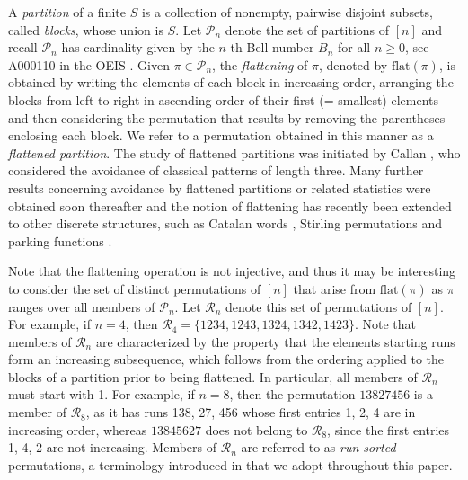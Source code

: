 \documentclass[11pt,a4paper]{article}
\begin{document}
A \emph{partition} of a finite $S$  is a collection of nonempty, pairwise disjoint subsets, called \emph{blocks}, whose union is $S$.  Let $\mathcal{P}_n$ denote the set of partitions of $[n]$ and recall $\mathcal{P}_n$ has cardinality given by the $n$-th Bell number $B_n$ for all $n\geq 0$, see A000110 in the OEIS \cite{Sl}.  Given $\pi \in \mathcal{P}_n$, the \emph{flattening} of $\pi$, denoted by $\text{flat}(\pi)$, is obtained by writing the elements of each block in increasing order, arranging the blocks from left to right in ascending order of their first (= smallest) elements and then considering the permutation that results by removing the parentheses enclosing each block. We refer to a permutation obtained in this manner as a \emph{flattened partition}.  The study of flattened partitions was initiated by Callan \cite{Callan}, who considered the avoidance of classical patterns of length three.  Many further results concerning avoidance by flattened partitions or related statistics were obtained soon thereafter and the notion of flattening has recently been extended to other discrete structures, such as Catalan words \cite{BHR}, Stirling permutations \cite{BEF} and parking functions \cite{EHM}.

Note that the flattening operation is not injective, and thus it may be interesting to consider the set of distinct permutations of $[n]$ that arise from $\text{flat}(\pi)$ as $\pi$ ranges over all members of $\mathcal{P}_n$.  Let $\mathcal{R}_n$ denote this set of permutations of $[n]$.  For example, if $n=4$, then $\mathcal{R}_4=\{1234, 1243, 1324, 1342, 1423\}$.  Note that members of $\mathcal{R}_n$ are characterized by the property that the elements starting runs form an increasing subsequence, which follows from the ordering applied to the blocks of a partition prior to being flattened.   In particular, all members of $\mathcal{R}_n$ must start with 1. For example, if $n=8$, then the permutation $13827456$ is a member of $\mathcal{R}_8$, as it has runs 138, 27, 456 whose first entries 1, 2, 4 are in increasing order, whereas $13845627$ does not belong to $\mathcal{R}_8$, since the first entries 1, 4, 2 are not increasing.  Members of $\mathcal{R}_n$ are referred to as \emph{run-sorted} permutations, a terminology introduced in \cite{ANab} that we adopt throughout this paper.
\end{document}
